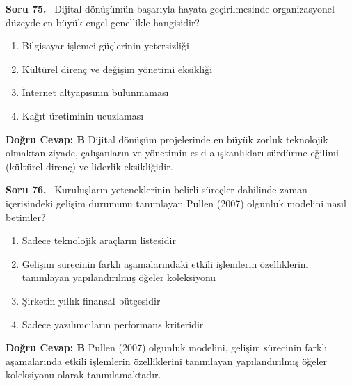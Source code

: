 \documentclass[11pt,a4paper,openany]{book}
\begin{document}
\needspace{5cm}
\vspace{8pt}
\noindent\textbf{\large\sffamily Soru 75.} \ Dijital dönüşümün başarıyla hayata geçirilmesinde organizasyonel düzeyde en büyük engel genellikle hangisidir?
\begin{enumerate}[label=\Alph*), leftmargin=25pt, topsep=4pt, itemsep=2pt]
    \item Bilgisayar işlemci güçlerinin yetersizliği
    \item Kültürel direnç ve değişim yönetimi eksikliği
    \item İnternet altyapısının bulunmaması
    \item Kağıt üretiminin ucuzlaması
\end{enumerate}
\vspace{4pt}
\begin{tcolorbox}[title=Cevap ve Açıklama, colback=gray!3!white, colframe=primarycolor!90!black, arc=2mm, fonttitle=\bfseries\sffamily, top=6pt, bottom=6pt]
    \textbf{Doğru Cevap: B}
    \vspace{2pt}
    Dijital dönüşüm projelerinde en büyük zorluk teknolojik olmaktan ziyade, çalışanların ve yönetimin eski alışkanlıkları sürdürme eğilimi (kültürel direnç) ve liderlik eksikliğidir.
\end{tcolorbox}
\vspace{10pt}

\needspace{5cm}
\vspace{8pt}
\noindent\textbf{\large\sffamily Soru 76.} \ Kuruluşların yeteneklerinin belirli süreçler dahilinde zaman içerisindeki gelişim durumunu tanımlayan Pullen (2007) olgunluk modelini nasıl betimler?
\begin{enumerate}[label=\Alph*), leftmargin=25pt, topsep=4pt, itemsep=2pt]
    \item Sadece teknolojik araçların listesidir
    \item Gelişim sürecinin farklı aşamalarındaki etkili işlemlerin özelliklerini tanımlayan yapılandırılmış öğeler koleksiyonu
    \item Şirketin yıllık finansal bütçesidir
    \item Sadece yazılımcıların performans kriteridir
\end{enumerate}
\vspace{4pt}
\begin{tcolorbox}[title=Cevap ve Açıklama, colback=gray!3!white, colframe=primarycolor!90!black, arc=2mm, fonttitle=\bfseries\sffamily, top=6pt, bottom=6pt]
    \textbf{Doğru Cevap: B}
    \vspace{2pt}
    Pullen (2007) olgunluk modelini, gelişim sürecinin farklı aşamalarında etkili işlemlerin özelliklerini tanımlayan yapılandırılmış öğeler koleksiyonu olarak tanımlamaktadır.
\end{tcolorbox}
\vspace{10pt}
\end{document}
